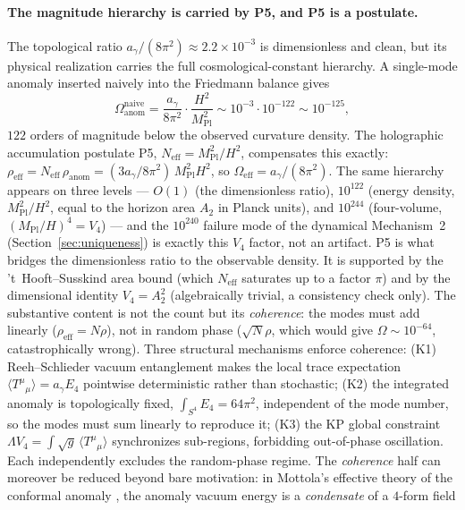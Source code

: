 \documentclass[11pt,a4paper]{article}
\theoremstyle{plain}
\theoremstyle{definition}
\theoremstyle{remark}
\newcommand{\ag}{a_\gamma}
\newcommand{\Mpl}{M_{\mathrm{Pl}}}
\newcommand{\avg}[1]{\langle #1 \rangle}
\begin{document}
\paragraph{The magnitude hierarchy is carried by P5, and P5 is a postulate.} The topological
ratio $\ag/(8\pi^2) \approx 2.2\times 10^{-3}$ is dimensionless and clean, but its physical
realization carries the full cosmological-constant hierarchy. A single-mode anomaly inserted
naively into the Friedmann balance gives
\begin{equation}
\Omega_{\mathrm{anom}}^{\mathrm{naive}} = \frac{\ag}{8\pi^2}\cdot\frac{H^2}{\Mpl^2}
\sim 10^{-3}\cdot 10^{-122} \sim 10^{-125},
\end{equation}
$122$ orders of magnitude below the observed curvature density. The holographic accumulation
postulate P5, $N_{\mathrm{eff}} = \Mpl^2/H^2$, compensates this exactly:
$\rho_{\mathrm{eff}} = N_{\mathrm{eff}}\,\rho_{\mathrm{anom}} = (3\ag/8\pi^2)\,\Mpl^2 H^2$, so
$\Omega_{\mathrm{eff}} = \ag/(8\pi^2)$. The same hierarchy appears on three levels --- $O(1)$ (the
dimensionless ratio), $10^{122}$ (energy density, $\Mpl^2/H^2$, equal to the horizon area $A_2$ in
Planck units), and $10^{244}$ (four-volume, $(\Mpl/H)^4 = V_4$) --- and the $10^{240}$ failure mode
of the dynamical Mechanism~2 (Section~\ref{sec:uniqueness}) is exactly this $V_4$ factor, not an
artifact. P5 is what bridges the dimensionless ratio to the observable density. It is supported by
the 't~Hooft--Susskind area bound (which $N_{\mathrm{eff}}$ saturates up to a factor $\pi$) and by
the dimensional identity $V_4 = A_2^2$ (algebraically trivial, a consistency check only). The
substantive content is not the count but its \emph{coherence}: the modes must add linearly
($\rho_{\mathrm{eff}} = N\rho$), not in random phase ($\sqrt N\rho$, which would give
$\Omega \sim 10^{-64}$, catastrophically wrong). Three structural mechanisms enforce coherence:
(K1) Reeh--Schlieder vacuum entanglement makes the local trace expectation
$\avg{T^\mu{}_\mu} = \ag E_4$ pointwise deterministic rather than stochastic; (K2) the integrated
anomaly is topologically fixed, $\int_{S^4} E_4 = 64\pi^2$, independent of the mode number, so the
modes must sum linearly to reproduce it; (K3) the KP global constraint
$\Lambda V_4 = \int\sqrt g\,\avg{T^\mu{}_\mu}$ synchronizes sub-regions, forbidding out-of-phase
oscillation. Each independently excludes the random-phase regime. The \emph{coherence} half can
moreover be reduced beyond bare motivation: in Mottola's effective theory of the conformal anomaly
\cite{Mottola2010,Mottola2022}, the anomaly vacuum energy is a \emph{condensate} of a $4$-form field
\end{document}
